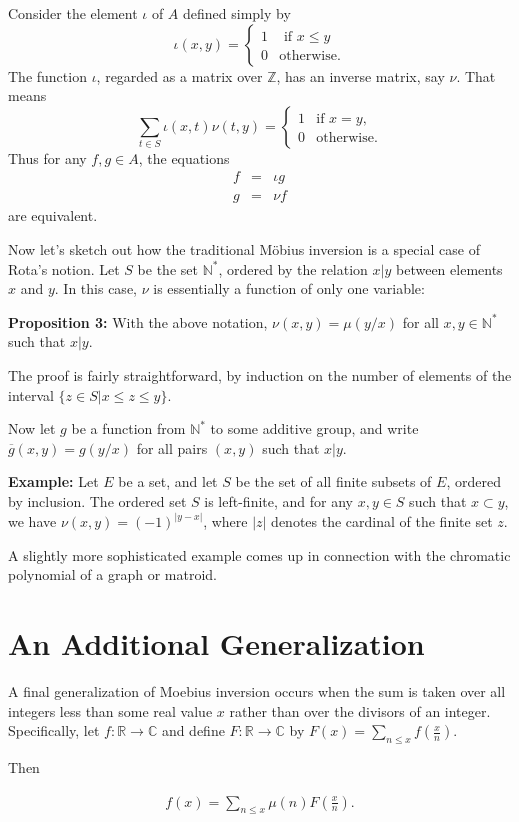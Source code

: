 \documentclass[12pt]{article}
\newcommand{\Z}{\mathbb{Z}}
\newcommand{\Nstar}{\mathbb{N}^{*}}
\begin{document}
Consider the element $\iota$ of $A$ defined simply by
\[\iota(x,y)=
\begin{cases}
1 & \textrm{ if $x\le y$} \\ 0 & \text{otherwise.}
\end{cases}\]
The function $\iota$, regarded as a matrix over $\Z$, has an inverse
matrix, say $\nu$. That means
\[
\sum_{t\in S}\iota(x,t)\nu(t,y)=
\begin{cases}
1 & \text{if $x=y$,} \\ 0 & \text{otherwise.}
\end{cases}
\]
Thus for any $f,g\in A$, the equations
\begin{eqnarray}
f&=&\iota g \\
g&=&\nu f
\end{eqnarray}
are equivalent.

Now let's sketch out how the traditional M\"obius inversion is a special
case of Rota's notion. Let $S$ be the set $\Nstar$, ordered by the relation
$x|y$ between elements $x$ and $y$. In this case, $\nu$ is essentially
a function of only one variable:

\textbf{Proposition 3:} With the above notation, $\nu(x,y)=\mu(y/x)$
for all $x,y\in\Nstar$ such that $x|y$.

The proof is fairly straightforward, by induction on the number
of elements of the interval $\{z\in S|x\le z\le y\}$.

Now let $g$ be a function from $\Nstar$ to some additive group,
and write $\overline{g}(x,y)=g(y/x)$ for all pairs $(x,y)$ such
that $x|y$. 

\textbf{Example: }Let $E$ be a set, and let $S$ be the set of all
finite subsets of $E$, ordered by inclusion. The ordered set $S$ is
left-finite, and for any $x,y\in S$ such that $x\subset y$,
we have $\nu(x,y)=(-1)^{|y-x|}$, where $|z|$ denotes the cardinal
of the finite set $z$.

A slightly more sophisticated example comes up in
connection with the chromatic polynomial of a graph or matroid.

\section*{An Additional Generalization}

A final generalization of Moebius inversion occurs when the sum is taken over all integers less than some real value $x$ rather than over the divisors of an integer.  Specifically, let $f:\mathbb{R}\rightarrow\mathbb{C}$ and define $F:\mathbb{R}\rightarrow \mathbb{C}$ by $F(x)=\sum_{n\leq x} f(\frac{x}{n})$.  

Then

\begin{align*}
f(x)=\sum_{n\leq x} \mu(n) F\left(\frac{x}{n}\right).
\end{align*}
\end{document}
